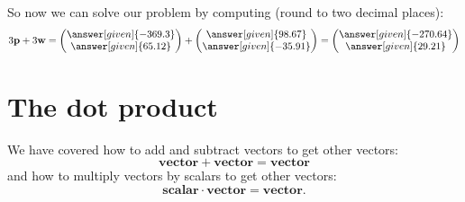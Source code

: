 \documentclass{ximera}
\begin{document}
\begin{example}[Navigation]
\begin{explanation}
\begin{enumerate}
\begin{center}
\begin{tikzpicture}[scale=2.5]
    \end{tikzpicture}
  \end{center}
  So now we can solve our problem by computing (round to two decimal places):
  \[
    3\vec{p} + 3 \vec{w} =
    \begin{pmatrix}
      \answer[given]{-369.3} \\
      \answer[given]{65.12}
    \end{pmatrix}
    +
    \begin{pmatrix}
      \answer[given]{98.67} \\
      \answer[given]{-35.91}
    \end{pmatrix}
    =
    \begin{pmatrix}
      \answer[given]{-270.64} \\
      \answer[given]{29.21}
    \end{pmatrix}
  \]
\end{enumerate}
\end{explanation}
\end{example}







\section{The dot product}


We have covered how to add and subtract vectors to get other vectors:
\[
\mathbf{vector} +\mathbf{vector} = \mathbf{vector}
\]
and how to multiply vectors by scalars to get other vectors:
\[
\mathbf{scalar}\cdot \mathbf{vector} = \mathbf{vector}.
\]
\end{document}
